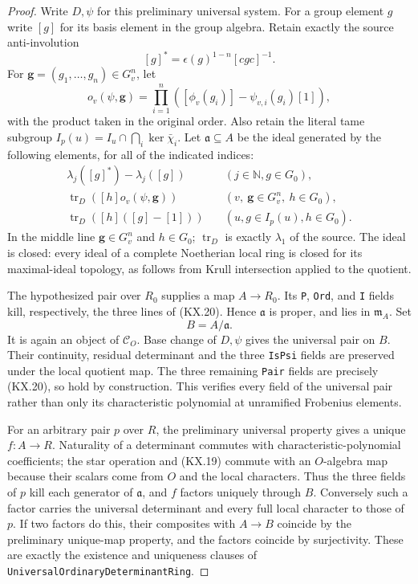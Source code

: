 \begin{proof}
Write $D,\psi$ for this preliminary universal system.  For a group
element $g$ write $[g]$ for its basis element in the group algebra.
Retain exactly the source anti-involution
\[
                 [g]^*=\epsilon(g)^{1-n}[cgc]^{-1}.
                                                               \tag{KX.18}
\]
For $\mathbf g=(g_1,\ldots,g_n)\in G_v^n$, let
\[
       o_v(\psi,\mathbf g)
             =\prod_{i=1}^n([\phi_v(g_i)]-\psi_{v,i}(g_i)[1]),
                                                               \tag{KX.19}
\]
with the product taken in the original order.  Also retain the
literal tame subgroup
$I_p(u)=I_u\cap\bigcap_i\ker\bar\chi_i$.
Let $\mathfrak a\subseteq A$ be the ideal generated by the
following elements, for all of the indicated indices:
\[
 \begin{aligned}
 \lambda_j([g]^*)-\lambda_j([g])
                                      &\quad(j\in\mathbb N, g\in G_0),\\
 \operatorname{tr}_D([h]o_v(\psi,\mathbf g))
                                      &\quad(v,\ \mathbf g\in G_v^n,\ h\in G_0),\\
 \operatorname{tr}_D([h]([g]-[1]))
                                      &\quad(u, g\in I_p(u), h\in G_0).
 \end{aligned}                                                 \tag{KX.20}
\]
In the middle line $\mathbf g\in G_v^n$ and $h\in G_0$;
$\operatorname{tr}_D$ is exactly $\lambda_1$ of the source.
The ideal is closed: every ideal of a complete Noetherian local
ring is closed for its maximal-ideal topology, as follows from
Krull intersection applied to the quotient.

The hypothesized pair over $R_0$ supplies a map $A\to R_0$.
Its \texttt{P}, \texttt{Ord}, and \texttt{I} fields kill,
respectively, the three lines of (KX.20).
Hence $\mathfrak a$ is proper, and lies in $\mathfrak m_A$.
Set
\[
                              B=A/\mathfrak a.
                                                               \tag{KX.21}
\]
It is again an object of $\mathcal C_O$.
Base change of $D,\psi$ gives the universal pair on $B$.
Their continuity, residual determinant and the three
\texttt{IsPsi} fields are preserved under the local quotient map.
The three remaining \texttt{Pair} fields are precisely (KX.20),
so hold by construction.  This verifies every field of the
universal pair rather than only its characteristic polynomial
at unramified Frobenius elements.

For an arbitrary pair $p$ over $R$, the preliminary universal
property gives a unique $f:A\to R$.  Naturality of a determinant
commutes with characteristic-polynomial coefficients; the star
operation and (KX.19) commute with an $O$-algebra map because
their scalars come from $O$ and the local characters.
Thus the three fields of $p$ kill each generator of
$\mathfrak a$, and $f$ factors uniquely through $B$.
Conversely such a factor carries the universal determinant and
every full local character to those of $p$.
If two factors do this, their composites with $A\to B$ coincide
by the preliminary unique-map property, and the factors coincide
by surjectivity.  These are exactly the existence and uniqueness
clauses of \texttt{UniversalOrdinaryDeterminantRing}.


\end{proof}
